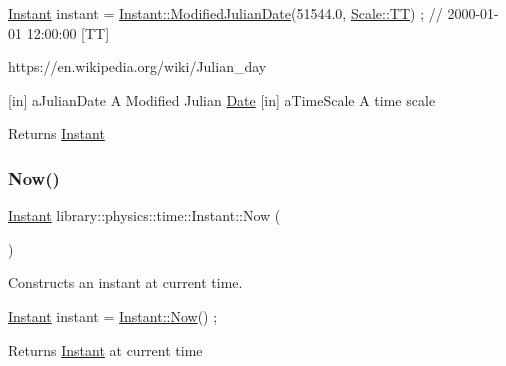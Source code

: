 \begin{DoxyCode}
\hyperlink{classlibrary_1_1physics_1_1time_1_1_instant_a7916a9d8acb9de4eda35f9d72086a618}{Instant} instant = \hyperlink{classlibrary_1_1physics_1_1time_1_1_instant_a800d784f67ed5eaa6432b71f4534a170}{Instant::ModifiedJulianDate}(51544.0, 
      \hyperlink{namespacelibrary_1_1physics_1_1time_a09d2bc9fbc7b0b5f92e1419bd655e6bbadf1f3edb9115acb0a1e04209b7a9937b}{Scale::TT}) ; \textcolor{comment}{// 2000-01-01 12:00:00 [TT]}
\end{DoxyCode}


https\+://en.wikipedia.\+org/wiki/\+Julian\+\_\+day

\mbox{[}in\mbox{]} a\+Julian\+Date A Modified Julian \hyperlink{classlibrary_1_1physics_1_1time_1_1_date}{Date}  \mbox{[}in\mbox{]} a\+Time\+Scale A time scale \begin{DoxyReturn}{Returns}
\hyperlink{classlibrary_1_1physics_1_1time_1_1_instant}{Instant} 
\end{DoxyReturn}
\mbox{\label{classlibrary_1_1physics_1_1time_1_1_instant_abdee2ddacb34859a3be2a4cf97c4af81}} 
\subsubsection{\texorpdfstring{Now()}{Now()}}
{\footnotesize\ttfamily \hyperlink{classlibrary_1_1physics_1_1time_1_1_instant}{Instant} library\+::physics\+::time\+::\+Instant\+::\+Now (\begin{DoxyParamCaption}{ }\end{DoxyParamCaption})\hspace{0.3cm}{\ttfamily [static]}}



Constructs an instant at current time. 


\begin{DoxyCode}
\hyperlink{classlibrary_1_1physics_1_1time_1_1_instant_a7916a9d8acb9de4eda35f9d72086a618}{Instant} instant = \hyperlink{classlibrary_1_1physics_1_1time_1_1_instant_abdee2ddacb34859a3be2a4cf97c4af81}{Instant::Now}() ;
\end{DoxyCode}


\begin{DoxyReturn}{Returns}
\hyperlink{classlibrary_1_1physics_1_1time_1_1_instant}{Instant} at current time 
\end{DoxyReturn}
\mbox{\label{classlibrary_1_1physics_1_1time_1_1_instant_a1d055c15365cc75756e6a85040e1ae04}} 

